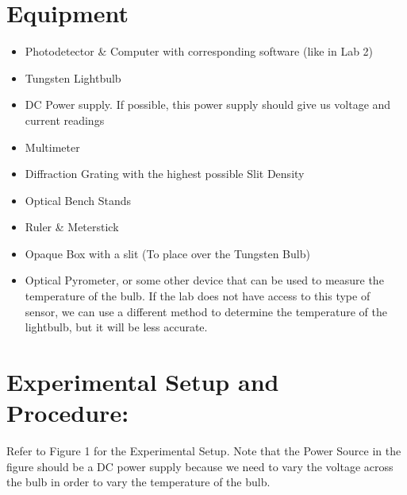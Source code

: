 \documentclass{article}
\begin{document}
\section{Equipment} %
\label{sec:equipment}
\begin{itemize}
	\item Photodetector \& Computer with corresponding software (like in Lab 2)
\item	Tungsten Lightbulb
\item	DC Power supply.  If possible, this power supply should give us voltage and current readings
\item	Multimeter
\item	Diffraction Grating with the highest possible Slit Density
\item	Optical Bench Stands
\item	Ruler \& Meterstick
\item	Opaque Box with a slit (To place over the Tungsten Bulb)
\item	Optical Pyrometer, or some other device that can be used to measure the temperature of the bulb.  If the lab does not have access to this type of sensor, we can use a different method to determine the temperature of the lightbulb, but it will be less accurate.

\end{itemize}

\section{Experimental Setup and Procedure:} %
\label{sec:experimental_setup_and_procedure_}

Refer to Figure 1 for the Experimental Setup.
Note that the Power Source in the figure should be a DC power supply because we need to vary the voltage across the bulb in order to vary the temperature of the bulb.  
\end{document}
